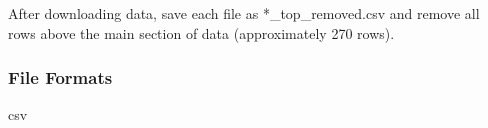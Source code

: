 After downloading data, save each file as *\_top\_removed.csv and remove all rows above the main section of data (approximately 270 rows). 








\subsubsection*{File Formats} 
csv

